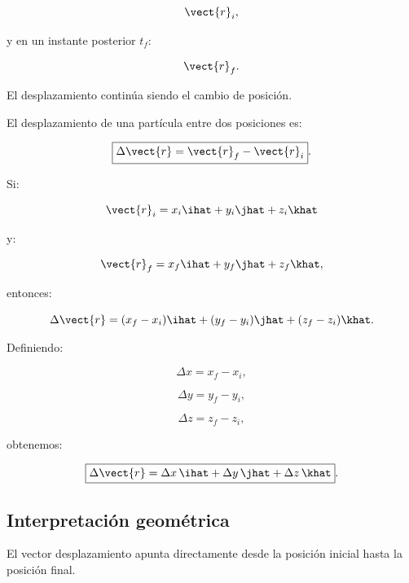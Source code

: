\[
\vect{r}_i,
\]

y en un instante posterior \(t_f\):

\[
\vect{r}_f.
\]

El desplazamiento continúa siendo el cambio de posición.

\begin{definicion}
El desplazamiento de una partícula entre dos posiciones es:

\[
\boxed{
\Delta\vect{r}
=
\vect{r}_f-\vect{r}_i
}.
\]
\end{definicion}

Si:

\[
\vect{r}_i
=
x_i\ihat+y_i\jhat+z_i\khat
\]

y:

\[
\vect{r}_f
=
x_f\ihat+y_f\jhat+z_f\khat,
\]

entonces:

\[
\Delta\vect{r}
=
(x_f-x_i)\ihat
+
(y_f-y_i)\jhat
+
(z_f-z_i)\khat.
\]

Definiendo:

\[
\Delta x=x_f-x_i,
\]

\[
\Delta y=y_f-y_i,
\]

\[
\Delta z=z_f-z_i,
\]

obtenemos:

\[
\boxed{
\Delta\vect{r}
=
\Delta x\,\ihat
+
\Delta y\,\jhat
+
\Delta z\,\khat
}.
\]


\subsection{Interpretación geométrica}

El vector desplazamiento apunta directamente desde la posición inicial hasta la
posición final.


